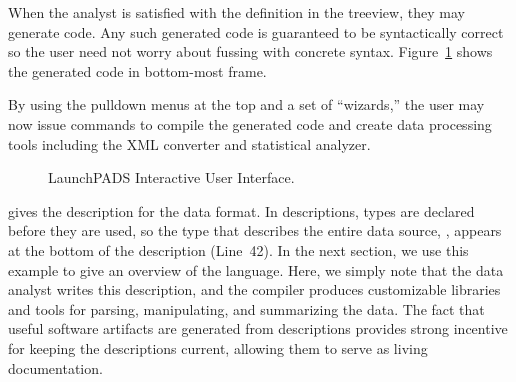 When the analyst is satisfied with the definition in the
treeview, they may generate \pads{} code.  Any such generated code is
guaranteed to be syntactically correct so the user need not worry
about fussing with concrete \pads{} syntax.
Figure~\ref{figure:launchpads} shows the generated code in bottom-most
frame.

By using the pulldown menus at the top and a set of
``wizards,'' the user may now
issue commands to compile the generated code and create data processing
tools including the XML converter and statistical analyzer.  

\begin{figure}
  \begin{center}
  \end{center}
  \caption{LaunchPADS Interactive User Interface.}
  \label{figure:launchpads}
\end{figure}

 gives the \pads{} description for the
\dibbler{} data format.  In \pads{} descriptions, types are declared
before they are used, so the type that describes the entire data
source, , appears at the bottom of the description (Line~42).  In
the next section, we use this example to give an overview of
the \pads{} language.  Here, we simply note that the data analyst
writes this description, and the \pads{} compiler produces
customizable \C{} libraries and tools for parsing, manipulating, and
summarizing the data.  The fact that useful software artifacts are
generated from \pads{} descriptions provides strong incentive for
keeping the descriptions current, allowing them to serve as living
documentation.

